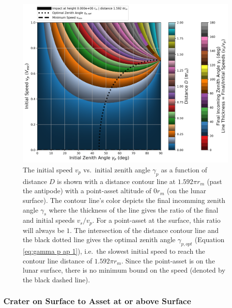 \documentclass{article}
\begin{document}
\begin{figure}[!htb]
	\centering
	\includegraphics[width=1.00\linewidth]{dist_speed_zenith_plot_003_0.000e+00_5.000.png}
	\caption{The initial speed $v_p$ vs.\ initial zenith angle $\gamma_p$ as a function of distance $D$ is shown with a distance contour line at $1.592\pi r_m$ (past the antipode) with a point-asset altitude of $0 r_m$ (on the lunar surface). The contour line's color depicts the final incomming zenith angle $\gamma_s$ where the thickness of the line gives the ratio of the final and initial speeds $v_s/v_p$. For a point-asset at the surface, this ratio will always be $1$. The intersection of the distance contour line and the black dotted line gives the optimal zenith angle $\gamma_{p,opt}$ (Equation~
		\eqref{eq:gamma p ap 1}), i.e.\ the slowest initial speed to reach the contour line distance of $1.592\pi r_m$. Since the point-asset is on the lunar surface, there is no minimum bound on the speed (denoted by the black dashed line).}\label{fig:dist_speed_zenith_plot_003_0.000e+00_5.000}
\end{figure}

\clearpage



\subsubsection{Crater on Surface to Asset at or above Surface}\label{sssec:Crater on Surface to Observer at or above Surface}
\end{document}
